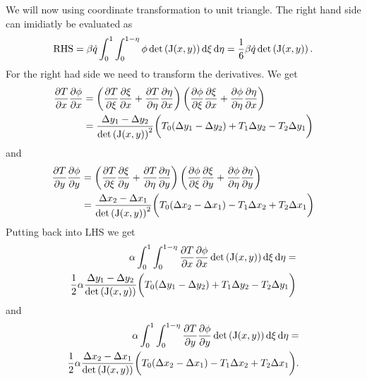 We will now using coordinate transformation to unit triangle.
The right hand side can imidiatly be evaluated as
\begin{align}
	\mathrm{RHS} = \beta \dot{q} \int_0^1 \int_0^{1 - \eta} \phi \det\left( \mathrm{J}(x, y) \right) \mathop{}\!\mathrm{d}{\xi} \mathop{}\!\mathrm{d}{\eta} = \frac{1}{6} \beta \dot{q}\det\left( \mathrm{J}(x, y) \right).
\end{align}
For the right had side we need to transform the derivatives.
We get
\begin{align}
	\pdv{T}{x}\pdv{\phi}{x} &= \left(\pdv{T}{\xi}\pdv{\xi}{x} + \pdv{T}{\eta}\pdv{\eta}{x}\right) \left(\pdv{\phi}{\xi}\pdv{\xi}{x} + \pdv{\phi}{\eta}\pdv{\eta}{x}\right)\\
	&= \frac{\Delta y_1 - \Delta y_2}{\det\left( \mathrm{J}(x, y) \right)^2} \bigg(T_0(\Delta y_1 - \Delta y_2) + T_1\Delta y_2 - T_2\Delta y_1 \bigg)
\end{align}
and
\begin{align}
	\pdv{T}{y}\pdv{\phi}{y} &= \left(\pdv{T}{\xi}\pdv{\xi}{y} + \pdv{T}{\eta}\pdv{\eta}{y}\right) \left(\pdv{\phi}{\xi}\pdv{\xi}{y} + \pdv{\phi}{\eta}\pdv{\eta}{y}\right)\\
	&= \frac{\Delta x_2 - \Delta x_1}{\det\left( \mathrm{J}(x, y) \right)^2} \bigg(T_0(\Delta x_2 - \Delta x_1) - T_1 \Delta x_2 + T_2 \Delta x_1\bigg)
\end{align}
Putting back into LHS we get
\begin{align}
	\alpha \int_0^1 \int_0^{1 - \eta} \pdv{T}{x}\pdv{\phi}{x} \det\left( \mathrm{J}(x, y) \right) \mathop{}\!\mathrm{d}{\xi} \mathop{}\!\mathrm{d}{\eta}  =\\
	\frac{1}{2} \alpha \frac{\Delta y_1 - \Delta y_2}{\det\left( \mathrm{J}(x, y) \right)} \bigg(T_0(\Delta y_1 - \Delta y_2) + T_1\Delta y_2 - T_2\Delta y_1 \bigg)
\end{align}
and
\begin{align}
	\alpha \int_0^1 \int_0^{1 - \eta} \pdv{T}{y}\pdv{\phi}{y} \det\left( \mathrm{J}(x, y) \right) \mathop{}\!\mathrm{d}{\xi} \mathop{}\!\mathrm{d}{\eta}  =\\
	\frac{1}{2} \alpha \frac{\Delta x_2 - \Delta x_1}{\det\left( \mathrm{J}(x, y) \right)} \bigg(T_0(\Delta x_2 - \Delta x_1) - T_1 \Delta x_2 + T_2 \Delta x_1\bigg).
\end{align}